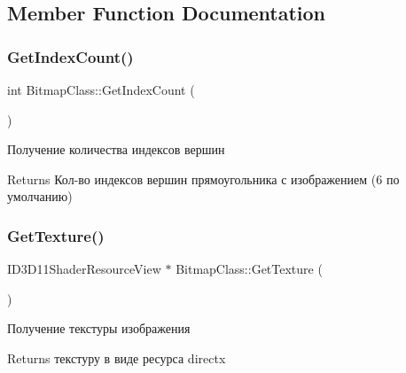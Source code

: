 \subsection{Member Function Documentation}
\mbox{\label{class_bitmap_class_aaafad2742ba7dcf9bcb3556579e7d9e5}} 
\subsubsection{\texorpdfstring{Get\+Index\+Count()}{GetIndexCount()}}
{\footnotesize\ttfamily int Bitmap\+Class\+::\+Get\+Index\+Count (\begin{DoxyParamCaption}{ }\end{DoxyParamCaption})}



Получение количества индексов вершин 

\begin{DoxyReturn}{Returns}
Кол-\/во индексов вершин прямоугольника с изображением (6 по умолчанию) 
\end{DoxyReturn}
\mbox{\label{class_bitmap_class_a9fc1968daa483cea1fede7d6785a7254}} 
\subsubsection{\texorpdfstring{Get\+Texture()}{GetTexture()}}
{\footnotesize\ttfamily I\+D3\+D11\+Shader\+Resource\+View $\ast$ Bitmap\+Class\+::\+Get\+Texture (\begin{DoxyParamCaption}{ }\end{DoxyParamCaption})}



Получение текстуры изображения 

\begin{DoxyReturn}{Returns}
текстуру в виде ресурса directx 
\end{DoxyReturn}
\mbox{\label{class_bitmap_class_a6bd2ec2f55bd8dd88b94829779b1ca8e}} 
